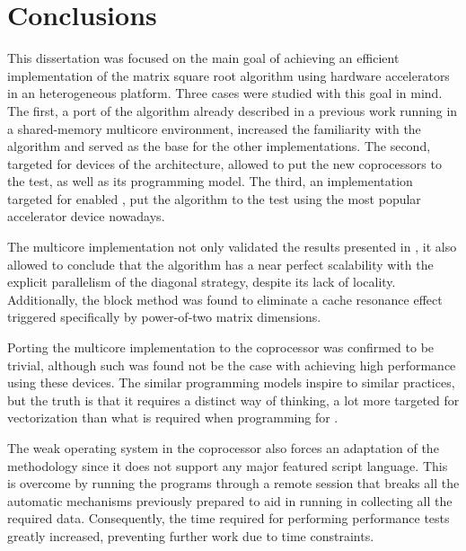\documentclass[../thesis]{subfiles}
\begin{document}
	\chapter{Conclusions}
	\label{chp:conclusions}

	This dissertation was focused on the main goal of achieving an efficient implementation of the matrix square root algorithm using hardware accelerators in an heterogeneous platform. Three cases were studied with this goal in mind. The first, a port of the algorithm already described in a previous work running in a shared-memory multicore environment, increased the familiarity with the algorithm and served as the base for the other implementations. The second, targeted for devices of the \intel\mic architecture, allowed to put the new \intel coprocessors to the test, as well as its programming model. The third, an implementation targeted for \cuda enabled \nvidia\gpus, put the algorithm to the test using the most popular accelerator device nowadays.

	The multicore implementation not only validated the results presented in \cite{Deadman:Higham:Ralha:2013}, it also allowed to conclude that the algorithm has a near perfect scalability with the explicit parallelism of the diagonal strategy, despite its lack of locality. Additionally, the block method was found to eliminate a cache resonance effect triggered specifically by power-of-two matrix dimensions.

	Porting the multicore implementation to the \intel\xeonphi coprocessor was confirmed to be trivial, although such was found not be the case with achieving high performance using these devices. The similar programming models inspire to similar practices, but the truth is that it requires a distinct way of thinking, a lot more targeted for vectorization than what is required when programming for \cpus.


	The weak operating system in the coprocessor also forces an adaptation of the methodology since it does not support any major featured script language. This is overcome by running the programs through a remote session that breaks all the automatic mechanisms previously prepared to aid in running in collecting all the required data. Consequently, the time required for performing performance tests greatly increased, preventing further work due to time constraints.
\end{document}
